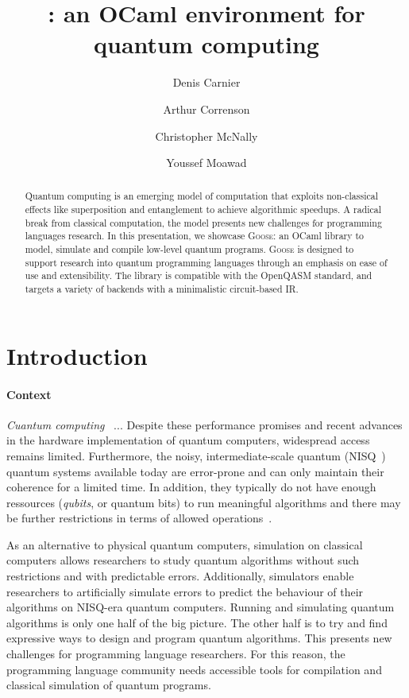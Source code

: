 \documentclass[a4paper]{easychair}
\title{\projname{}: an OCaml environment for quantum computing}
\author{
  Denis Carnier\inst{1}
  \and
  Arthur Correnson\inst{2}
  \and
  Christopher McNally\inst{3}
  \and
  Youssef Moawad\inst{4}
}
\institute{
  imec-DistriNet, KU Leuven
\and
  Ecole Normale Sup\'erieure de Rennes
\and
  Massachusetts Institute of Technology
\and
  University of Glasgow
}
\newcommand{\definition}[1]{\textit{#1}}
\newcommand{\projname}{\textsc{Goose}}
\begin{document}
\maketitle

\begin{abstract}
Quantum computing is an emerging model of computation that exploits non-classical effects like superposition and entanglement to achieve algorithmic speedups. A radical break from classical computation, the model presents new challenges for programming languages research. In this presentation, we showcase \projname{}: an OCaml library to model, simulate and compile low-level quantum programs. \projname{} is designed to support research into quantum programming languages through an emphasis on ease of use and extensibility. The library is compatible with the OpenQASM standard, and targets a variety of backends with a minimalistic circuit-based IR.
\end{abstract}

\section{Introduction}

\paragraph*{Context}

\definition{Cuantum computing}~\cite{Chuang2010} ...  Despite these performance promises and recent advances in the hardware implementation of quantum computers, widespread access remains limited. Furthermore, the noisy, intermediate-scale quantum (NISQ~\cite{Preskill}) quantum systems available today are error-prone and can only maintain their coherence for a limited time. In addition, they typically do not have enough ressources (\definition{qubits}, or quantum bits) to run meaningful algorithms and there may be further restrictions in terms of allowed operations~\cite{Gyongyosi2019}.

As an alternative to physical quantum computers, simulation on classical computers allows researchers to study quantum algorithms without such restrictions and with predictable errors. Additionally, simulators enable researchers to artificially simulate errors to predict the behaviour of their algorithms on NISQ-era quantum computers. Running and simulating quantum algorithms is only one half of the big picture. The other half is to try and find expressive ways to design and program quantum algorithms. This presents new challenges for programming language researchers. For this reason, the programming language community needs accessible tools for compilation and classical simulation of quantum programs.
\end{document}
